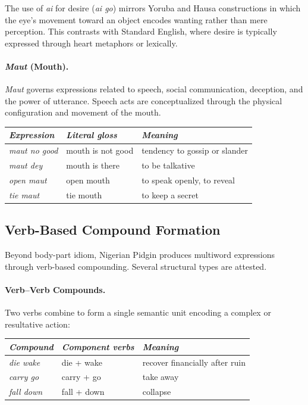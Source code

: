 \documentclass[12pt]{article}
\begin{document}
The use of \textit{ai} for desire (\textit{ai go}) mirrors Yoruba and Hausa constructions in which the eye's movement toward an object encodes wanting rather than mere perception. This contrasts with Standard English, where desire is typically expressed through heart metaphors or lexically.

\paragraph{\textit{Maut} (Mouth).}
\textit{Maut} governs expressions related to speech, social communication, deception, and the power of utterance. Speech acts are conceptualized through the physical configuration and movement of the mouth.

\begin{center}
\begin{tabular}{lll}
\textit{Expression} & \textit{Literal gloss} & \textit{Meaning} \\
\hline
\textit{maut no good} & mouth is not good & tendency to gossip or slander \\
\textit{maut dey} & mouth is there & to be talkative \\
\textit{open maut} & open mouth & to speak openly, to reveal \\
\textit{tie maut} & tie mouth & to keep a secret \\
\end{tabular}
\end{center}

\subsection{Verb-Based Compound Formation}

Beyond body-part idiom, Nigerian Pidgin produces multiword expressions through verb-based compounding. Several structural types are attested.

\paragraph{Verb--Verb Compounds.}
Two verbs combine to form a single semantic unit encoding a complex or resultative action:

\begin{center}
\begin{tabular}{lll}
\textit{Compound} & \textit{Component verbs} & \textit{Meaning} \\
\hline
\textit{die wake} & die + wake & recover financially after ruin \\
\textit{carry go} & carry + go & take away \\
\textit{fall down} & fall + down & collapse \\
\end{tabular}
\end{center}
\end{document}
